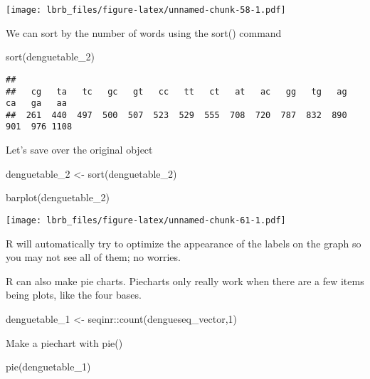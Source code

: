 \documentclass[
]{book}
\newenvironment{Shaded}{\begin{snugshade}}{\end{snugshade}}
\newcommand{\DecValTok}[1]{\textcolor[rgb]{0.00,0.00,0.81}{#1}}
\newcommand{\FunctionTok}[1]{\textcolor[rgb]{0.00,0.00,0.00}{#1}}
\newcommand{\NormalTok}[1]{#1}
\newcommand{\OtherTok}[1]{\textcolor[rgb]{0.56,0.35,0.01}{#1}}
\newcommand{\SpecialCharTok}[1]{\textcolor[rgb]{0.00,0.00,0.00}{#1}}
\begin{document}
\texttt{[image: lbrb\_files/figure-latex/unnamed-chunk-58-1.pdf]}

We can sort by the number of words using the sort() command

\begin{Shaded}
\begin{Highlighting}[]
\FunctionTok{sort}\NormalTok{(denguetable\_2)}
\end{Highlighting}
\end{Shaded}

\begin{verbatim}
## 
##   cg   ta   tc   gc   gt   cc   tt   ct   at   ac   gg   tg   ag   ca   ga   aa 
##  261  440  497  500  507  523  529  555  708  720  787  832  890  901  976 1108
\end{verbatim}

Let's save over the original object

\begin{Shaded}
\begin{Highlighting}[]
\NormalTok{denguetable\_2 }\OtherTok{\textless{}{-}} \FunctionTok{sort}\NormalTok{(denguetable\_2)}
\end{Highlighting}
\end{Shaded}

\begin{Shaded}
\begin{Highlighting}[]
\FunctionTok{barplot}\NormalTok{(denguetable\_2)}
\end{Highlighting}
\end{Shaded}

\texttt{[image: lbrb\_files/figure-latex/unnamed-chunk-61-1.pdf]}

R will automatically try to optimize the appearance of the labels on the graph so you may not see all of them; no worries.

R can also make pie charts. Piecharts only really work when there are a few items being plots, like the four bases.

\begin{Shaded}
\begin{Highlighting}[]
\NormalTok{denguetable\_1 }\OtherTok{\textless{}{-}}\NormalTok{ seqinr}\SpecialCharTok{::}\FunctionTok{count}\NormalTok{(dengueseq\_vector,}\DecValTok{1}\NormalTok{)}
\end{Highlighting}
\end{Shaded}

Make a piechart with pie()

\begin{Shaded}
\begin{Highlighting}[]
\FunctionTok{pie}\NormalTok{(denguetable\_1)}
\end{Highlighting}
\end{Shaded}
\end{document}
